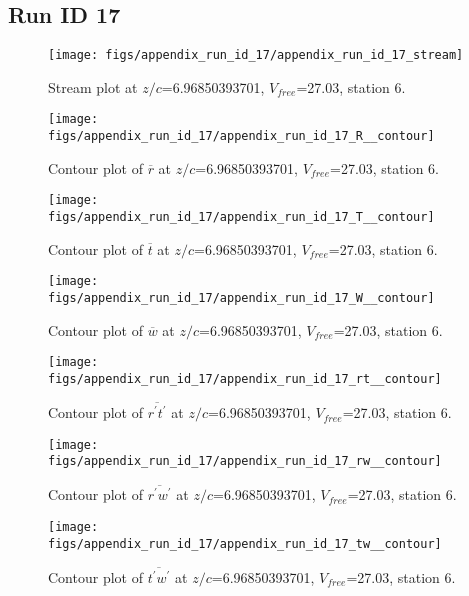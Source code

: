 \subsection{Run ID 17}
\begin{figure}[H]
\centering
\texttt{[image: figs/appendix\_run\_id\_17/appendix\_run\_id\_17\_stream]}
\caption{Stream plot at $z/c$=6.96850393701, $V_{free}$=27.03, station 6.}
\label{fig:appendix_run_id_17_stream}
\end{figure}


\begin{figure}[H]
\centering
\texttt{[image: figs/appendix\_run\_id\_17/appendix\_run\_id\_17\_R\_\_contour]}
\caption{Contour plot of $\overline{r}$ at $z/c$=6.96850393701, $V_{free}$=27.03, station 6.}
\label{fig:appendix_run_id_17_R__contour}
\end{figure}


\begin{figure}[H]
\centering
\texttt{[image: figs/appendix\_run\_id\_17/appendix\_run\_id\_17\_T\_\_contour]}
\caption{Contour plot of $\overline{t}$ at $z/c$=6.96850393701, $V_{free}$=27.03, station 6.}
\label{fig:appendix_run_id_17_T__contour}
\end{figure}


\begin{figure}[H]
\centering
\texttt{[image: figs/appendix\_run\_id\_17/appendix\_run\_id\_17\_W\_\_contour]}
\caption{Contour plot of $\overline{w}$ at $z/c$=6.96850393701, $V_{free}$=27.03, station 6.}
\label{fig:appendix_run_id_17_W__contour}
\end{figure}


\begin{figure}[H]
\centering
\texttt{[image: figs/appendix\_run\_id\_17/appendix\_run\_id\_17\_rt\_\_contour]}
\caption{Contour plot of $\overline{r^\prime t^\prime}$ at $z/c$=6.96850393701, $V_{free}$=27.03, station 6.}
\label{fig:appendix_run_id_17_rt__contour}
\end{figure}


\begin{figure}[H]
\centering
\texttt{[image: figs/appendix\_run\_id\_17/appendix\_run\_id\_17\_rw\_\_contour]}
\caption{Contour plot of $\overline{r^\prime w^\prime}$ at $z/c$=6.96850393701, $V_{free}$=27.03, station 6.}
\label{fig:appendix_run_id_17_rw__contour}
\end{figure}


\begin{figure}[H]
\centering
\texttt{[image: figs/appendix\_run\_id\_17/appendix\_run\_id\_17\_tw\_\_contour]}
\caption{Contour plot of $\overline{t^\prime w^\prime}$ at $z/c$=6.96850393701, $V_{free}$=27.03, station 6.}
\label{fig:appendix_run_id_17_tw__contour}
\end{figure}


